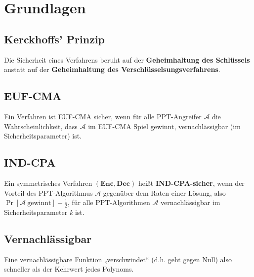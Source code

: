 \section{Grundlagen}%
\label{gl:sec:grundlagen}

\subsection{Kerckhoffs' Prinzip}%
\label{gl:sub:kerckhoffs-prinzip}
Die Sicherheit eines Verfahrens beruht auf der \textbf{Geheimhaltung des Schlüssels}
anstatt auf der \textbf{Geheimhaltung des Verschlüsselsungsverfahrens}.

\subsection{EUF-CMA}%
\label{gl:sub:euf-cma}
Ein Verfahren ist EUF-CMA sicher, wenn für alle PPT-Angreifer \(\mathcal{A}\) die Wahrscheinlichkeit,
dass \(\mathcal{A}\) im EUF-CMA Spiel gewinnt, vernachlässigbar (im Sicherheitsparameter) ist.

\subsection{IND-CPA}%
\label{gl:sub:ind-cpa}
Ein symmetrisches Verfahren \((\mathbf{Enc}, \mathbf{Dec})\) heißt \textbf{IND-CPA-sicher}, wenn der Vorteil des
PPT-Algorithmus \(\mathcal{A}\) gegenüber dem Raten einer Lösung, also
\(\Pr\left[\mathcal{A}\ \text{gewinnt}\right] - \frac{1}{2}\), für alle
PPT-Algorithmen \(\mathcal{A}\) vernachlässigbar im Sicherheitsparameter \textit{k} ist.

\subsection{Vernachlässigbar}%
\label{gl:sub:vernachlaessigbar}
Eine vernachlässigbare Funktion „verschwindet“ (d.h. geht gegen Null) also schneller als der
Kehrwert jedes Polynoms.